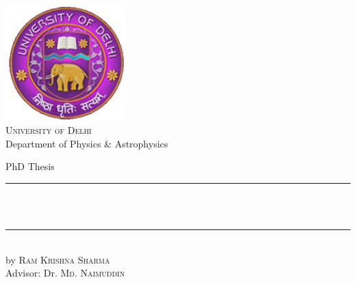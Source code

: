 \begin{titlepage}
	\begin{addmargin}[-1cm]{-1cm}
    \begin{center}
        \large
    \includegraphics[width=0.35\textwidth]{figures/logo_du.jpg}\\
        \vfill
        {\Large \textsc{University of Delhi}}\\[1ex]
        Department of Physics \& Astrophysics\\

        \vfill

        PhD Thesis\\ \vskip1cm
        \rule{14cm}{0.4pt} \\ \bigskip
            \textbf{\Large{\color{Maroon}{Search for Anomalous Gauge Coupling through Vector Boson Scattering and Development of the GEM Detectors at the CMS Experiment}}} \\ \bigskip
        \rule{14cm}{0.4pt}\\ \vskip1cm
        by \textsc{Ram Krishna Sharma}\\
        \vfill
        Advisor: Dr. \textsc{Md. Naimuddin}\\

        \vfill
        \vfill
        \vfill

    \end{center}
  \end{addmargin}
\end{titlepage}